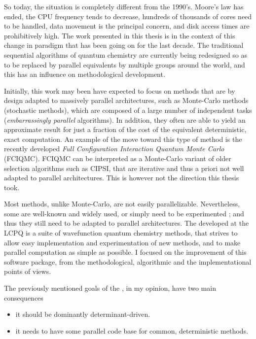 \documentclass[12pt,a4paper]{report}
\begin{document}
So today, the situation is completely different from the 1990's.
Moore's law has ended,\cite{Khan2018Jan} the CPU frequency tends to decrease,
hundreds of thousands of cores need to be handled, data movement is the
principal concern, and disk access times are prohibitively high.
The work presented in this thesis is in the context of this change in paradigm
that has been going on for the last decade.
The traditional sequential algorithms of quantum chemistry are currently being
redesigned so as to be replaced by parallel equivalents by multiple groups
around the world, and this has an influence on methodological development.

Initially, this work may been have expected to focus on methods that are by
design adapted to massively parallel architectures, such as Monte-Carlo methods
(stochastic methods), which are composed of a large number of independent tasks
(\emph{embarrassingly parallel} algorithms). In addition, they often are able
to yield an approximate result for just a fraction of the cost of the
equivalent deterministic, exact computation. An example of the move toward this
type of method is the recently developed \emph{Full Configuration Interaction
Quantum Monte Carlo} (FCIQMC).\cite{Booth_2009} FCIQMC can be interpreted as a
Monte-Carlo variant of older selection algorithms such as
CIPSI,\cite{uron_1973} that are iterative and thus a priori not well adapted to
parallel architectures. This is however not the direction this thesis took.

Most methods, unlike Monte-Carlo, are not easily parallelizable.
Nevertheless, some are well-known and widely used, or simply need to be
experimented ; and thus they still need to be adapted to parallel
architectures. The \QP developed at the LCPQ is a suite of wavefunction quantum
chemistry methods, that strives to allow easy implementation and
experimentation of new methods, and to make parallel computation as simple as
possible. I focused on the improvement of this software package, from the
methodological, algorithmic and the implementational points of views.

The previously mentioned goals of the \QP, in my opinion, have two main consequences
\begin{itemize}
\item
it should be dominantly determinant-driven.
\item
it needs to have some parallel code base for common, deterministic methods.
\end{itemize}
\end{document}
